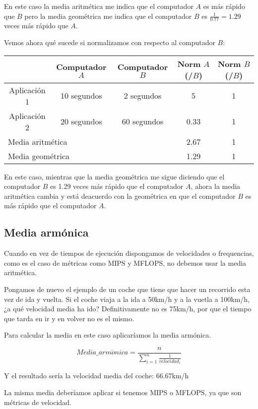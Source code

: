 \documentclass[12pt,onecolumn]{memoir}
\begin{document}
En este caso la media aritmética me indica que el computador $A$ es
más rápido que $B$ pero la media geométrica me indica que el
computador $B$ es $\frac{1}{0.77}=1.29$ veces más rápido que $A$.

Vemos ahora qué sucede si normalizamos con respecto al computador $B$:

\begin{center}
\begin{tabular}{ccccc}
\hline
  & Computador $A$ & Computador $B$ & Norm $A$(/$B$) & Norm $B$(/$B$) \\ 
\hline
Aplicación 1 & 10 segundos & 2 segundos & 5 & 1 \\  
Aplicación 2 & 20 segundos & 60 segundos & 0.33 & 1 \\
\hline
\multicolumn{2}{l}{Media aritmética} &  & 2.67 & 1 \\
\hline
\multicolumn{2}{l}{Media geométrica} &  & 1.29 & 1 \\
\hline
\end{tabular}
\end{center}

En este caso, mientras que la media geométrica me sigue diciendo que
el computador $B$ es 1.29 veces más rápido que el computador $A$,
ahora la media aritmética cambia y está deacuerdo con la geométrica en
que el computador $B$ es más rápido que el computador $A$.

\subsection{Media armónica}

Cuando en vez de tiempos de ejecución dispongamos de velocidades o
frequencias, como
es el caso de métricas como MIPS y MFLOPS, no debemos usar la media
aritmética.

Pongamos de nuevo el ejemplo de un coche que tiene que hacer un
recorrido esta vez de ida y vuelta. Si el coche viaja a la ida a
50km/h y a la vuetla a 100km/h, ¿a qué velocidad media ha ido?
Definitivamente no es 75km/h, por que el tiempo que tarda en ir y en
volver no es el mismo.

Para calcular la media en este caso aplicaríamos la media armónica.

\[ Media\_arm\acute{o}nica = \frac{n}{\sum_{i=1}^{n} \frac{1}{velocidad_i}} \]

Y el resultado sería la velocidad media del coche: 66.67km/h

La misma media deberíamos aplicar si tenemos MIPS o MFLOPS, ya que son
métricas de velocidad.
\end{document}
